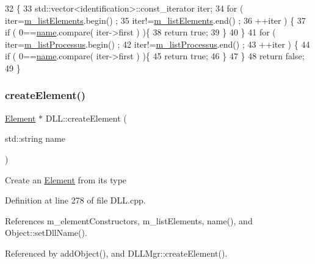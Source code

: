\begin{DoxyCode}
32                                           \{
33   std::vector<identification>::const\_iterator iter;
34   \textcolor{keywordflow}{for} ( iter=\hyperlink{classDLL_a2e88d7167245fd7b6a000817583643ed}{m\_listElements}.begin() ;
35         iter!=\hyperlink{classDLL_a2e88d7167245fd7b6a000817583643ed}{m\_listElements}.end() ;
36         ++iter ) \{
37     \textcolor{keywordflow}{if} ( 0==\hyperlink{classDLL_a0a915d538771dde2cb0580cd340ee088}{name}.compare( iter->first ) )\{
38       \textcolor{keywordflow}{return} \textcolor{keyword}{true};
39     \}
40   \}
41   \textcolor{keywordflow}{for} ( iter=\hyperlink{classDLL_a197e92b990184a27a74f4a0456897bd5}{m\_listProcessus}.begin() ;
42         iter!=\hyperlink{classDLL_a197e92b990184a27a74f4a0456897bd5}{m\_listProcessus}.end() ;
43         ++iter ) \{
44     \textcolor{keywordflow}{if} ( 0==\hyperlink{classDLL_a0a915d538771dde2cb0580cd340ee088}{name}.compare( iter->first ) )\{
45       \textcolor{keywordflow}{return} \textcolor{keyword}{true};
46     \}
47   \}
48   \textcolor{keywordflow}{return} \textcolor{keyword}{false};
49 \}
\end{DoxyCode}
\mbox{\label{classDLL_a20cd236b93830729cad8fcec092e5e18}} 
\subsubsection{\texorpdfstring{create\+Element()}{createElement()}}
{\footnotesize\ttfamily \hyperlink{classElement}{Element} $\ast$ D\+L\+L\+::create\+Element (\begin{DoxyParamCaption}\item[{std\+::string}]{name }\end{DoxyParamCaption})}

Create an \hyperlink{classElement}{Element} from its type 

Definition at line 278 of file D\+L\+L.\+cpp.



References m\+\_\+element\+Constructors, m\+\_\+list\+Elements, name(), and Object\+::set\+Dll\+Name().



Referenced by add\+Object(), and D\+L\+L\+Mgr\+::create\+Element().


